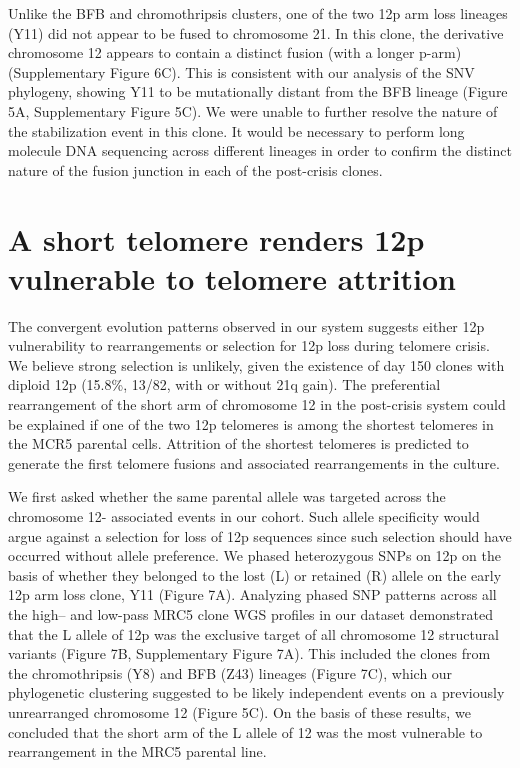 \documentclass[phd,tocprelim]{cornell}
\begin{document}
Unlike the BFB and chromothripsis clusters, one of the two 12p arm loss lineages (Y11) did not appear to be fused to chromosome 21. In this clone, the derivative chromosome 12 appears to contain a distinct fusion (with a longer p-arm) (Supplementary Figure 6C). This is consistent with our analysis of the SNV phylogeny, showing Y11 to be mutationally distant from the BFB lineage (Figure 5A, Supplementary Figure 5C).  We were unable to further resolve the nature of the stabilization event in this clone. It would be necessary to perform long molecule DNA sequencing across different lineages in order to confirm the distinct nature of the fusion junction in each of the post-crisis clones.

\section{A short telomere renders 12p vulnerable to telomere attrition}
The convergent evolution patterns observed in our system suggests either 12p vulnerability to rearrangements or selection for 12p loss during telomere crisis. We believe strong selection is unlikely, given the existence of day 150 clones with diploid 12p (15.8\%, 13/82, with or without 21q gain). The preferential rearrangement of the short arm of chromosome 12 in the post-crisis system could be explained if one of the two 12p telomeres is among the shortest telomeres in the MCR5 parental cells. Attrition of the shortest telomeres is predicted to generate the first telomere fusions and associated rearrangements in the culture. 

We first asked whether the same parental allele was targeted across the chromosome 12- associated events in our cohort. Such allele specificity would argue against a selection for loss of 12p sequences since such selection should have occurred without allele preference. We phased heterozygous SNPs on 12p on the basis of whether they belonged to the lost (L) or retained (R) allele on the early 12p arm loss clone, Y11 (Figure 7A). Analyzing phased SNP patterns across all the high– and low-pass MRC5 clone WGS profiles in our dataset demonstrated that the L allele of 12p was the exclusive target of all chromosome 12 structural variants (Figure 7B, Supplementary Figure 7A). This included the clones from the chromothripsis (Y8) and BFB (Z43) lineages (Figure 7C), which our phylogenetic clustering suggested to be likely independent events on a previously unrearranged chromosome 12 (Figure 5C). On the basis of these results, we concluded that the short arm of the L allele of 12 was the most vulnerable to rearrangement in the MRC5 parental line. 
\end{document}
